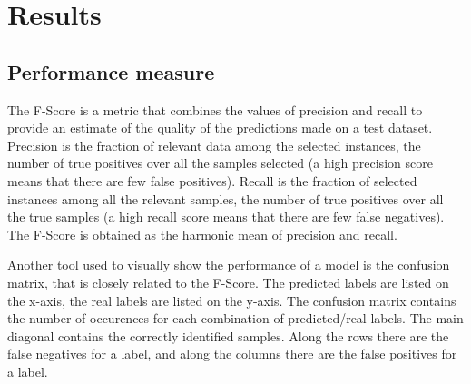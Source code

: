
\section{Results}
\label{sec:results}

\subsection{Performance measure}


The F-Score is a metric that combines the values of precision and recall to
provide an estimate of the quality of the predictions made on a test dataset.
Precision is the fraction of relevant data among the selected instances,
the number of true positives over all the samples selected
(a high precision score means that there are few false positives).
Recall is the fraction of selected instances among all the relevant samples,
the number of true positives over all the true samples
(a high recall score means that there are few false negatives).
The F-Score is obtained as the harmonic mean of precision and recall.

Another tool used to visually show the performance of a model
is the confusion matrix, that is closely related to the F-Score.
The predicted labels are listed on the x-axis,
the real labels are listed on the y-axis.
The confusion matrix contains
the number of occurences
for each combination of predicted/real labels.
The main diagonal contains the correctly identified samples.
Along the rows there are the false negatives for a label,
and along the columns there are the false positives for a label.


